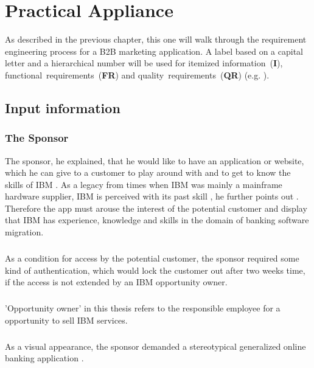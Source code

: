 \chapter{Practical Appliance}
As described in the previous chapter, this one will walk through the requirement engineering process for a B2B marketing application. A label based on a capital letter and a hierarchical number will be used for itemized \mbox{information (\textbf{I})}, \mbox{functional requirements (\textbf{FR})} and \mbox{quality requirements (\textbf{QR})} (e.g. ).
\section{Input information}
\subsection{The Sponsor}
The sponsor, he explained, that he would like to have an application or website, which he can give to a customer to play around with and to get to know the skills of IBM \parencite{Sachs.20.04.2017}. As a legacy from times when IBM was mainly a mainframe hardware supplier, IBM is perceived with its past skill , he further points out \parencite{Sachs.20.04.2017}. Therefore the app must arouse the interest of the potential customer and display that IBM has experience, knowledge and skills in the domain of banking software migration. 

\paragraph{} As a condition for access by the potential customer, the sponsor required some kind of authentication, which would lock the customer out after two weeks time, if the access is not extended by an IBM opportunity owner\parencite[cf.][]{Sachs.2017}.

\paragraph{} 'Opportunity owner' in this thesis refers to the responsible employee for a opportunity to sell IBM services.

\paragraph{} As a visual appearance, the sponsor demanded a stereotypical generalized online banking application \parencite[cf.][]{Sachs.2017}.


